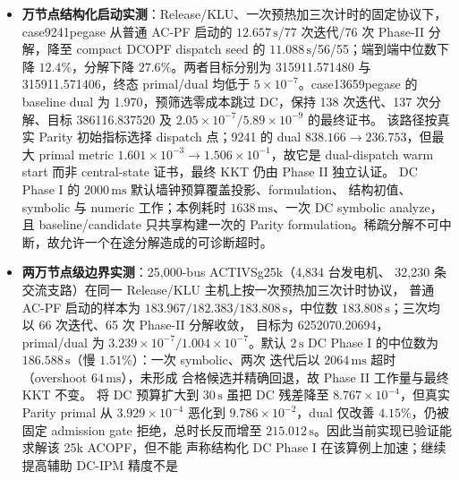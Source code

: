 \begin{itemize}
         的字段注释记载 PEGASE 大网实测——
        case13659pegase 经暖启动以 189 次迭代收敛于参考最优、同伦延续认证
        2869 节点精确解与 9241 节点 $-0.013\%$ 偏差
        （ 与
）。这些数字为注释记载、非本章实测复核。
  \item \textbf{万节点结构化启动实测}：Release/KLU、一次预热加三次计时的固定协议下，
        case9241pegase 从普通 AC-PF 启动的 $12.657\,\mathrm{s}$/77 次迭代/76 次
        Phase-II 分解，降至 compact DCOPF dispatch seed 的
        $11.088\,\mathrm{s}$/56/55；端到端中位数下降 $12.4\%$，分解下降
        $27.6\%$。两者目标分别为 315911.571480 与 315911.571406，终态
        primal/dual 均低于 $5\times10^{-7}$。case13659pegase 的 baseline dual
        为 1.970，预筛选零成本跳过 DC，保持 138 次迭代、137 次分解、目标
        386116.837520 及 $2.05\times10^{-7}/5.89\times10^{-9}$ 的最终证书。
        该路径按真实 Parity 初始指标选择 dispatch 点；9241 的 dual
        $838.166\to236.753$，但最大 primal metric
        $1.601\times10^{-3}\to1.506\times10^{-1}$，故它是 dual-dispatch
        warm start 而非 central-state 证书，最终 KKT 仍由 Phase II 独立认证。
        DC Phase I 的 $2000\,\mathrm{ms}$ 默认墙钟预算覆盖投影、formulation、
        结构初值、symbolic 与 numeric 工作；本例耗时 $1638\,\mathrm{ms}$、一次
        DC symbolic analyze，且 baseline/candidate 只共享构建一次的 Parity
        formulation。稀疏分解不可中断，故允许一个在途分解造成的可诊断超时。
  \item \textbf{两万节点级边界实测}：25,000-bus ACTIVSg25k（4,834 台发电机、
        32,230 条交流支路）在同一 Release/KLU 主机上按一次预热加三次计时协议，
        普通 AC-PF 启动的样本为 $183.967/182.383/183.808\,\mathrm{s}$，中位数
        $183.808\,\mathrm{s}$；三次均以 66 次迭代、65 次 Phase-II 分解收敛，
        目标为 6252070.20694，primal/dual 为
        $3.239\times10^{-7}/1.004\times10^{-7}$。默认 $2\,\mathrm{s}$ DC Phase I
        的中位数为 $186.588\,\mathrm{s}$（慢 $1.51\%$）：一次 symbolic、两次
        迭代后以 $2064\,\mathrm{ms}$ 超时（overshoot $64\,\mathrm{ms}$），未形成
        合格候选并精确回退，故 Phase II 工作量与最终 KKT 不变。
        将 DC 预算扩大到 $30\,\mathrm{s}$ 虽把 DC 残差降至
        $8.767\times10^{-4}$，但真实 Parity primal 从
        $3.929\times10^{-4}$ 恶化到 $9.786\times10^{-2}$，dual 仅改善
        $4.15\%$，仍被固定 admission gate 拒绝，总时长反而增至
        $215.012\,\mathrm{s}$。因此当前实现已验证能求解该 25k ACOPF，但不能
        声称结构化 DC Phase I 在该算例上加速；继续提高辅助 DC-IPM 精度不是

\end{itemize}

